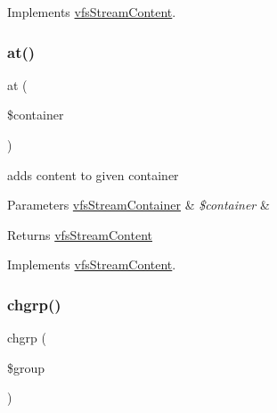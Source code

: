 Implements \mbox{\hyperlink{interfaceorg_1_1bovigo_1_1vfs_1_1vfs_stream_content_a1769b12aee6e9730bcf9b56703eb6a03}{vfs\+Stream\+Content}}.

\mbox{\label{classorg_1_1bovigo_1_1vfs_1_1vfs_stream_abstract_content_a807677a6a863886bc4aa2dbc1f473d56}} 
\subsubsection{\texorpdfstring{at()}{at()}}
{\footnotesize\ttfamily at (\begin{DoxyParamCaption}\item[{\mbox{\hyperlink{interfaceorg_1_1bovigo_1_1vfs_1_1vfs_stream_container}{vfs\+Stream\+Container}}}]{\$container }\end{DoxyParamCaption})}

adds content to given container


\begin{DoxyParams}[1]{Parameters}
\mbox{\hyperlink{interfaceorg_1_1bovigo_1_1vfs_1_1vfs_stream_container}{vfs\+Stream\+Container}} & {\em \$container} & \\
\hline
\end{DoxyParams}
\begin{DoxyReturn}{Returns}
\mbox{\hyperlink{interfaceorg_1_1bovigo_1_1vfs_1_1vfs_stream_content}{vfs\+Stream\+Content}} 
\end{DoxyReturn}


Implements \mbox{\hyperlink{interfaceorg_1_1bovigo_1_1vfs_1_1vfs_stream_content_a807677a6a863886bc4aa2dbc1f473d56}{vfs\+Stream\+Content}}.

\mbox{\label{classorg_1_1bovigo_1_1vfs_1_1vfs_stream_abstract_content_ae3667c8a6ad2f23f1163ba4533a20525}} 
\subsubsection{\texorpdfstring{chgrp()}{chgrp()}}
{\footnotesize\ttfamily chgrp (\begin{DoxyParamCaption}\item[{}]{\$group }\end{DoxyParamCaption})}


